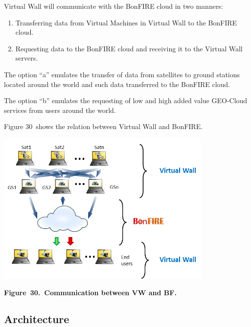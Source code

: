 \documentclass[a4paper]{article}
\newcounter{saveenum}
\newcommand\liststyleLFOxxxviii{%
\renewcommand\theenumi{\alph{enumi}}
\renewcommand\theenumii{\alph{enumii}}
\renewcommand\theenumiii{\roman{enumiii}}
\renewcommand\theenumiv{\arabic{enumiv}}
\renewcommand\labelenumi{\theenumi)}
\renewcommand\labelenumii{\theenumii.}
\renewcommand\labelenumiii{\theenumiii.}
\renewcommand\labelenumiv{\theenumiv.}
}
\begin{document}
\bigskip

Virtual Wall will communicate with the BonFIRE cloud in two manners:

\liststyleLFOxxxviii
\setcounter{saveenum}{\value{enumi}}
\begin{enumerate}
\setcounter{enumi}{\value{saveenum}}
\item Transferring data from Virtual Machines in Virtual Wall to the
BonFIRE cloud.
\item Requesting data to the BonFIRE cloud and receiving it to the
Virtual Wall servers.
\end{enumerate}
The option {\textquotedblleft}a{\textquotedblright} emulates the
transfer of data from satellites to ground stations located around the
world and such data transferred to the BonFIRE cloud.


\bigskip

The option {\textquotedblleft}b{\textquotedblright} emulates the
requesting of low and high added value GEO-Cloud services from users
around the world.


\bigskip

Figure 30\ shows the relation between Virtual Wall and BonFIRE.


\bigskip


\bigskip

{\centering 
\includegraphics[width=4.20349in,height=2.99424in]{out-img38.png} \par}

{\centering\bfseries
\label{bkm:Ref378262923}Figure\ 30.\ Communication between VW and BF.
\par}

\subsection[Architecture]{Architecture}
\hypertarget{Toc381777230}{}
\bigskip
\end{document}
